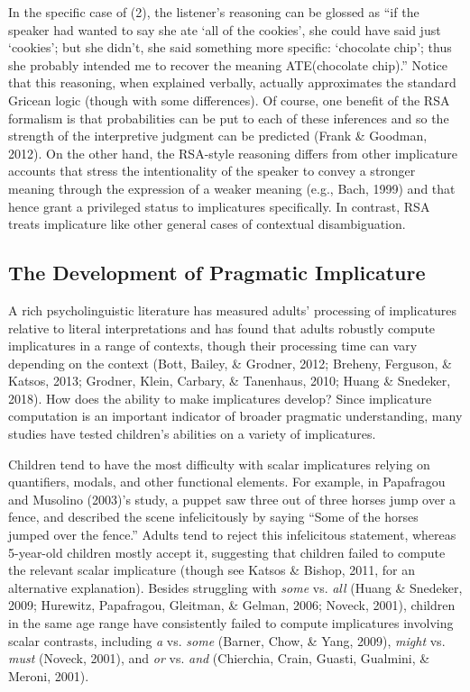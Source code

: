\documentclass[man]{apa6}
\begin{document}
In the specific case of (2), the listener's reasoning can be glossed as
\enquote{if the speaker had wanted to say she ate \enquote{all of the
cookies}, she could have said just \enquote{cookies}; but she didn't,
she said something more specific: \enquote{chocolate chip}; thus she
probably intended me to recover the meaning ATE(chocolate chip).} Notice
that this reasoning, when explained verbally, actually approximates the
standard Gricean logic (though with some differences). Of course, one
benefit of the RSA formalism is that probabilities can be put to each of
these inferences and so the strength of the interpretive judgment can be
predicted (Frank \& Goodman, 2012). On the other hand, the RSA-style
reasoning differs from other implicature accounts that stress the
intentionality of the speaker to convey a stronger meaning through the
expression of a weaker meaning (e.g., Bach, 1999) and that hence grant a
privileged status to implicatures specifically. In contrast, RSA treats
implicature like other general cases of contextual disambiguation.

\subsection{The Development of Pragmatic
Implicature}\label{the-development-of-pragmatic-implicature}

A rich psycholinguistic literature has measured adults' processing of
implicatures relative to literal interpretations and has found that
adults robustly compute implicatures in a range of contexts, though
their processing time can vary depending on the context (Bott, Bailey,
\& Grodner, 2012; Breheny, Ferguson, \& Katsos, 2013; Grodner, Klein,
Carbary, \& Tanenhaus, 2010; Huang \& Snedeker, 2018). How does the
ability to make implicatures develop? Since implicature computation is
an important indicator of broader pragmatic understanding, many studies
have tested children's abilities on a variety of implicatures.

Children tend to have the most difficulty with scalar implicatures
relying on quantifiers, modals, and other functional elements. For
example, in Papafragou and Musolino (2003)'s study, a puppet saw three
out of three horses jump over a fence, and described the scene
infelicitously by saying \enquote{Some of the horses jumped over the
fence.} Adults tend to reject this infelicitous statement, whereas
5-year-old children mostly accept it, suggesting that children failed to
compute the relevant scalar implicature (though see Katsos \& Bishop,
2011, for an alternative explanation). Besides struggling with
\emph{some} vs. \emph{all} (Huang \& Snedeker, 2009; Hurewitz,
Papafragou, Gleitman, \& Gelman, 2006; Noveck, 2001), children in the
same age range have consistently failed to compute implicatures
involving scalar contrasts, including \emph{a} vs. \emph{some} (Barner,
Chow, \& Yang, 2009), \emph{might} vs. \emph{must} (Noveck, 2001), and
\emph{or} vs. \emph{and} (Chierchia, Crain, Guasti, Gualmini, \& Meroni,
2001).
\end{document}
